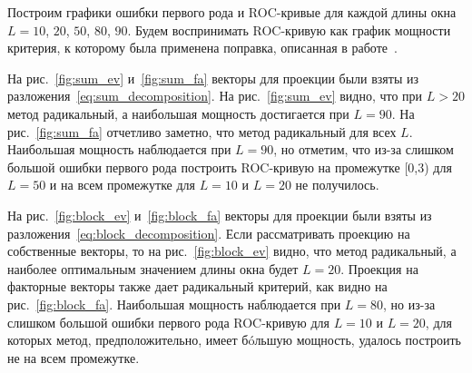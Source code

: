 \documentclass[specialist,
substylefile = spbu_report.rtx,
subf,href,colorlinks=true, 12pt]{disser}
\theoremstyle{definition}
\begin{document}
	Построим графики ошибки первого рода и ROC-кривые для каждой длины окна $L=10$, $20$, $50$, $80$, $90$. Будем воспринимать ROC-кривую как график мощности критерия, к которому была применена поправка, описанная в работе~\cite{master}. 
	

	
	На рис.~\ref{fig:sum_ev} и~\ref{fig:sum_fa} векторы для проекции были взяты из разложения~\eqref{eq:sum_decomposition}. На рис.~\ref{fig:sum_ev} видно, что при $L>20$ метод радикальный, а наибольшая мощность достигается при $L=90$. На рис.~\ref{fig:sum_fa} отчетливо заметно, что метод радикальный для всех $L$. Наибольшая мощность наблюдается при $L=90$, но отметим, что из-за слишком большой ошибки первого рода построить ROC-кривую на промежутке [0,3) для $L=50$ и на всем промежутке для $L=10$ и $L=20$ не получилось.
	
	На рис.~\ref{fig:block_ev} и~\ref{fig:block_fa} векторы для проекции были взяты из разложения~\eqref{eq:block_decomposition}. Если рассматривать проекцию на собственные векторы, то на рис.~\ref{fig:block_ev} видно, что метод радикальный, а наиболее оптимальным значением длины окна будет $L=20$. Проекция на факторные векторы также дает радикальный критерий, как видно на рис.~\ref{fig:block_fa}. Наибольшая мощность наблюдается при $L=80$, но из-за слишком большой ошибки первого рода ROC-кривую для $L=10$ и $L=20$, для которых метод, предположительно, имеет б\'oльшую мощность, удалось построить не на всем промежутке.
	
\end{document}
